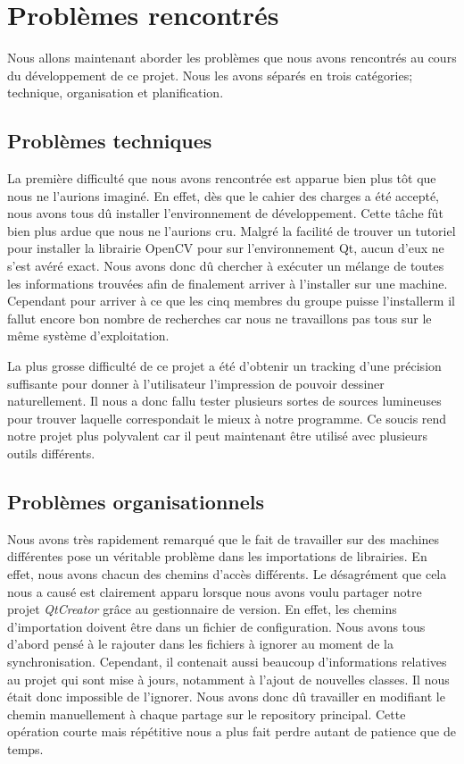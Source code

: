 \documentclass[11pt,a4paper,oldfontcommands]{memoir}
\begin{document}
\section{Problèmes rencontrés}

Nous allons maintenant aborder les problèmes que nous avons rencontrés au cours du développement de ce projet. Nous les avons séparés en trois catégories;  technique, organisation et planification.

\subsection{Problèmes techniques}

La première difficulté que nous avons rencontrée est apparue bien plus tôt que nous ne l'aurions imaginé. En effet, dès que le cahier des charges a été accepté, nous avons tous dû installer l'environnement de développement. Cette tâche fût bien plus ardue que nous ne l'aurions cru. Malgré la facilité de trouver un tutoriel pour installer la librairie OpenCV pour sur l'environnement Qt, aucun d'eux ne s'est avéré exact. Nous avons donc dû chercher à exécuter un mélange de toutes les informations trouvées afin de finalement arriver à l'installer sur une machine. Cependant pour arriver à ce que les cinq membres du groupe puisse l'installerm il fallut encore bon nombre de recherches car nous ne travaillons pas tous sur le même système d'exploitation.

La plus grosse difficulté de ce projet a été d'obtenir un tracking d'une précision suffisante pour donner à l'utilisateur l'impression de pouvoir dessiner naturellement. Il nous a donc fallu tester plusieurs sortes de sources lumineuses pour trouver laquelle correspondait le mieux à notre programme. Ce soucis rend notre projet plus polyvalent car il peut maintenant être utilisé avec plusieurs outils différents.

\subsection{Problèmes organisationnels}

Nous avons très rapidement remarqué que le fait de travailler sur des machines différentes pose un véritable problème dans les importations de librairies. En effet, nous avons chacun des chemins d'accès différents. Le désagrément que cela nous a causé est clairement apparu lorsque nous avons voulu partager notre projet \textit{QtCreator} grâce au gestionnaire de version. En effet, les chemins d'importation doivent être dans un fichier de configuration. Nous avons tous d'abord pensé à le rajouter dans les fichiers à ignorer au moment de la synchronisation. Cependant, il contenait aussi beaucoup d'informations relatives au projet qui sont mise à jours, notamment à l'ajout de nouvelles classes. Il nous était donc impossible de l'ignorer. Nous avons donc dû travailler en modifiant le chemin manuellement à chaque partage sur le repository principal. Cette opération courte mais répétitive nous a plus fait perdre autant de patience que de temps.
\end{document}
